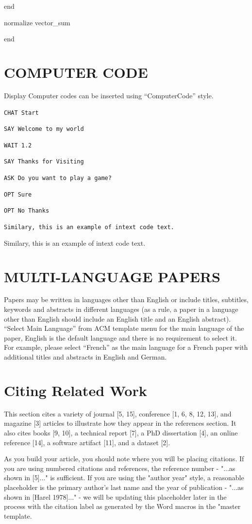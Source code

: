 \documentclass[conference]{IEEEtran}
\begin{document}
      end

     normalize vector\_sum

end

\section{COMPUTER CODE}

Display Computer codes can be inserted using “ComputerCode” style.

\texttt{CHAT Start}

\texttt{SAY Welcome to my world}

\texttt{WAIT 1.2}

\texttt{SAY Thanks for Visiting}

\texttt{ASK Do you want to play a game?}

\texttt{OPT Sure}

\texttt{OPT No Thanks}

\texttt{Similary, this is an example of intext code text.}

Similary, this is an example of intext code text.

\section{MULTI-LANGUAGE PAPERS}

Papers may be written in languages other than English or include titles, subtitles, keywords and abstracts in different languages (as a rule, a paper in a language other than English should include an English title and an English abstract). “Select Main Language” from ACM template menu for the main language of the paper, English is the default language and there is no requirement to select it. For example, please select “French” as the main language for a French paper with additional titles and abstracts in English and German.

\section{Citing Related Work}

This section cites a variety of journal [5, 15], conference [1, 6, 8, 12, 13], and magazine [3] articles to illustrate how they appear in the references section. It also cites books [9, 10], a technical report [7], a PhD dissertation [4], an online reference [14], a software artifact [11], and a dataset [2].

As you build your article, you should note where you will be placing citations. If you are using numbered citations and references, the reference number - "...as shown in [5]..." is sufficient. If you are using the "author year" style, a reasonable placeholder is the primary author's last name and the year of publication - "...as shown in [Harel 1978]..." - we will be updating this placeholder later in the process with the citation label as generated by the Word macros in the "master template.
\end{document}
